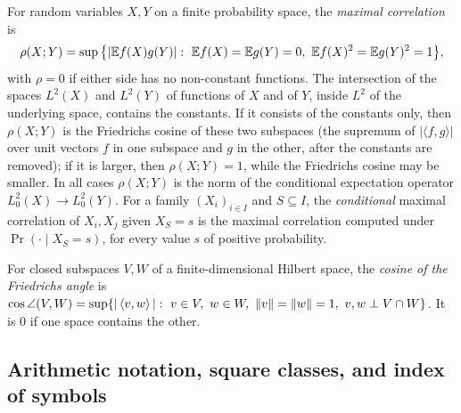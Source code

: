 \begin{definition}\label{def:prelim:maxcorr}
For random variables $X,Y$ on a finite probability space, the \emph{maximal
correlation} is
\[
  \rho(X;Y)=\sup\big\{|\mathbb E f(X)g(Y)|:\ \mathbb E f(X)=\mathbb E g(Y)=0,\ \mathbb E f(X)^2=\mathbb E g(Y)^2=1\big\},
\]
with $\rho=0$ if either side has no non-constant functions. The intersection
of the spaces $L^2(X)$ and $L^2(Y)$ of functions of $X$ and of $Y$, inside
$L^2$ of the underlying space, contains the constants. If it consists of the constants only, then
$\rho(X;Y)$ is the Friedrichs cosine of these two subspaces
(the supremum of $|\langle f,g\rangle|$ over unit vectors $f$ in
one subspace and $g$ in the other, after the constants are
removed); if it is larger,
then $\rho(X;Y)=1$, while the Friedrichs cosine may be smaller. In all cases
$\rho(X;Y)$ is the norm of the conditional expectation operator
$L^2_0(X)\to L^2_0(Y)$. For a family $(X_i)_{i\in I}$ and $S\subseteq I$, the
\emph{conditional} maximal correlation of $X_i,X_j$ given $X_S=s$ is the
maximal correlation computed under $\Pr(\cdot\mid X_S=s)$, for every value
$s$ of positive probability.
\end{definition}

\begin{definition}\label{def:prelim:angle}
For closed subspaces $V,W$ of a finite-dimensional Hilbert space, the
\emph{cosine of the Friedrichs angle} is
$\cos\angle(V,W)=\sup\{|\left\langle v,w\right\rangle|:\ v\in V,\ w\in W,\ \left\|v\right\|=\left\|w\right\|=1,\
v,w\perp V\cap W\}$. It is $0$ if one space contains the other.
\end{definition}

\subsection{Arithmetic notation, square classes, and index of symbols}\label{subsec:notation:symbols}

